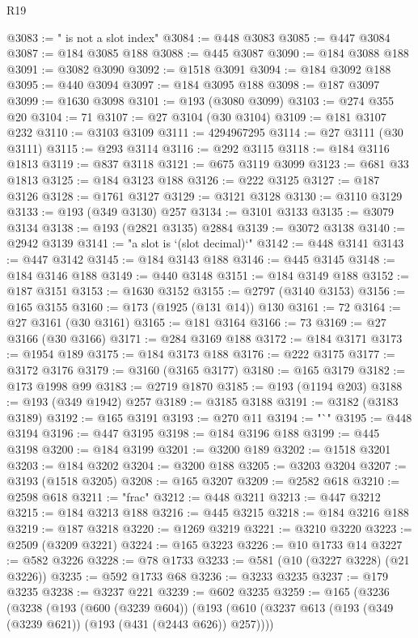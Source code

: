\begin{lexlean}{R19}
\begin{coremodule}
@3083 := " is not a slot index"
@3084 := @448 @3083
@3085 := @447 @3084
@3087 := @184 @3085 @188
@3088 := @445 @3087
@3090 := @184 @3088 @188
@3091 := @3082 @3090
@3092 := @1518 @3091
@3094 := @184 @3092 @188
@3095 := @440 @3094
@3097 := @184 @3095 @188
@3098 := @187 @3097
@3099 := @1630 @3098
@3101 := @193 (@3080 @3099)
@3103 := @274 @355 @20
@3104 := 71
@3107 := @27 @3104 (@30 @3104)
@3109 := @181 @3107 @232
@3110 := @3103 @3109
@3111 := 4294967295
@3114 := @27 @3111 (@30 @3111)
@3115 := @293 @3114
@3116 := @292 @3115
@3118 := @184 @3116 @1813
@3119 := @837 @3118
@3121 := @675 @3119 @3099
@3123 := @681 @33 @1813
@3125 := @184 @3123 @188
@3126 := @222 @3125
@3127 := @187 @3126
@3128 := @1761 @3127
@3129 := @3121 @3128
@3130 := @3110 @3129
@3133 := @193 (@349 @3130) @257
@3134 := @3101 @3133
@3135 := @3079 @3134
@3138 := @193 (@2821 @3135) @2884
@3139 := @3072 @3138
@3140 := @2942 @3139
@3141 := "a slot is `(slot decimal)`"
@3142 := @448 @3141
@3143 := @447 @3142
@3145 := @184 @3143 @188
@3146 := @445 @3145
@3148 := @184 @3146 @188
@3149 := @440 @3148
@3151 := @184 @3149 @188
@3152 := @187 @3151
@3153 := @1630 @3152
@3155 := @2797 (@3140 @3153)
@3156 := @165 @3155
@3160 := @173 (@1925 (@131 @14)) @130
@3161 := 72
@3164 := @27 @3161 (@30 @3161)
@3165 := @181 @3164
@3166 := 73
@3169 := @27 @3166 (@30 @3166)
@3171 := @284 @3169 @188
@3172 := @184 @3171
@3173 := @1954 @189
@3175 := @184 @3173 @188
@3176 := @222 @3175
@3177 := @3172 @3176
@3179 := @3160 (@3165 @3177)
@3180 := @165 @3179
@3182 := @173 @1998 @99
@3183 := @2719 @1870
@3185 := @193 (@1194 @203)
@3188 := @193 (@349 @1942) @257
@3189 := @3185 @3188
@3191 := @3182 (@3183 @3189)
@3192 := @165 @3191
@3193 := @270 @11
@3194 := "`"
@3195 := @448 @3194
@3196 := @447 @3195
@3198 := @184 @3196 @188
@3199 := @445 @3198
@3200 := @184 @3199
@3201 := @3200 @189
@3202 := @1518 @3201
@3203 := @184 @3202
@3204 := @3200 @188
@3205 := @3203 @3204
@3207 := @3193 (@1518 @3205)
@3208 := @165 @3207
@3209 := @2582 @618
@3210 := @2598 @618
@3211 := "frac"
@3212 := @448 @3211
@3213 := @447 @3212
@3215 := @184 @3213 @188
@3216 := @445 @3215
@3218 := @184 @3216 @188
@3219 := @187 @3218
@3220 := @1269 @3219
@3221 := @3210 @3220
@3223 := @2509 (@3209 @3221)
@3224 := @165 @3223
@3226 := @10 @1733 @14
@3227 := @582 @3226
@3228 := @78 @1733
@3233 := @581 (@10 (@3227 @3228) (@21 @3226))
@3235 := @592 @1733 @68
@3236 := @3233 @3235
@3237 := @179 @3235
@3238 := @3237 @221
@3239 := @602 @3235
@3259 := @165
    (@3236
      (@3238
        (@193
          (@600 (@3239 @604))
          (@193
            (@610 (@3237 @613 (@193 (@349 (@3239 @621)) (@193 (@431 (@2443 @626)) @257))))

\end{coremodule}
\end{lexlean}

